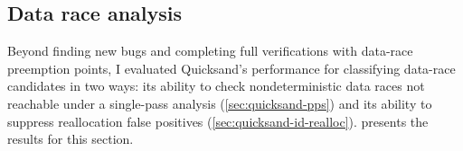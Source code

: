 
\subsection{Data race analysis}
\label{sec:quicksand-eval-nondets}

Beyond finding new bugs and completing full verifications with data-race preemption points,
I evaluated Quicksand's performance for classifying data-race candidates in two ways:
its ability to check nondeterministic data races not reachable under a single-pass analysis (\cref{sec:quicksand-pps})
and its ability to suppress reallocation false positives (\cref{sec:quicksand-id-realloc}).
 presents the results for this section.

